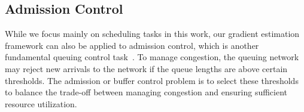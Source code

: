 
\subsection{Admission Control}
\label{section:admission}

While we focus mainly on scheduling tasks in this work, our gradient estimation framework can also be applied to admission control, which is another fundamental queuing control task~\cite{naor1969regulation, chr1972individual, ccil2009effects, ghosh2007optimal, koccauga2010admission}. To manage congestion, the queuing network may reject new arrivals to the network if the queue lengths are above certain thresholds. The admission or buffer control problem is to select these thresholds to balance the trade-off between managing congestion and ensuring sufficient resource utilization.

